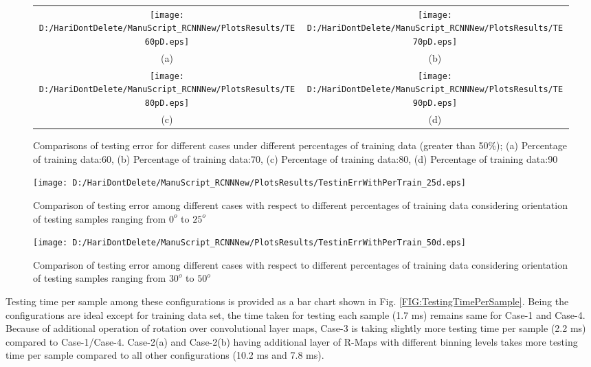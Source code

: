  \begin{figure*}
\begin{tabular}{cc}
\texttt{[image: D:/HariDontDelete/ManuScript\_RCNNNew/PlotsResults/TE60pD.eps]}&\texttt{[image: D:/HariDontDelete/ManuScript\_RCNNNew/PlotsResults/TE70pD.eps]}\\
(a)  & (b) \\
\texttt{[image: D:/HariDontDelete/ManuScript\_RCNNNew/PlotsResults/TE80pD.eps]}&\texttt{[image: D:/HariDontDelete/ManuScript\_RCNNNew/PlotsResults/TE90pD.eps]}\\
(c)  & (d) \\

\end{tabular}
\caption{ Comparisons of testing error for different cases under different percentages of training data  (greater than 50$\%$); (a) Percentage of training data:60, (b) Percentage of training data:70, (c) Percentage of training data:80, (d) Percentage of training data:90}
\label{FIG:TestingErrMorethan50}

\end{figure*}
 
\begin{figure}[h]
 \centering
 \texttt{[image: D:/HariDontDelete/ManuScript\_RCNNNew/PlotsResults/TestinErrWithPerTrain\_25d.eps]}
\caption{Comparison of testing error among different cases with respect to different percentages of training data considering orientation of testing samples ranging from $0^o$ to $25^o$}
\label{FIG:TestingErrwithPerTrain25deg}
\end{figure}
 
\begin{figure*}
 \centering
 \texttt{[image: D:/HariDontDelete/ManuScript\_RCNNNew/PlotsResults/TestinErrWithPerTrain\_50d.eps]}
\caption{Comparison of testing error among different cases with respect to different percentages of training data considering orientation of testing samples ranging from $30^o$ to $50^o$}
\label{FIG:TestingErrwithPerTrain50deg}
\end{figure*} 
 
 Testing time per sample among these configurations is provided as a bar chart shown in Fig. \ref{FIG:TestingTimePerSample}. Being the configurations are ideal except for training data set, the time taken for testing each sample (1.7 ms) remains same for Case-1 and Case-4. Because of additional operation of rotation over convolutional layer maps, Case-3 is taking slightly more testing time per sample (2.2 ms) compared to Case-1/Case-4. Case-2(a) and Case-2(b) having additional layer of R-Maps with different binning levels takes more testing time per sample compared to all other configurations (10.2 ms and 7.8 ms). \\
 

